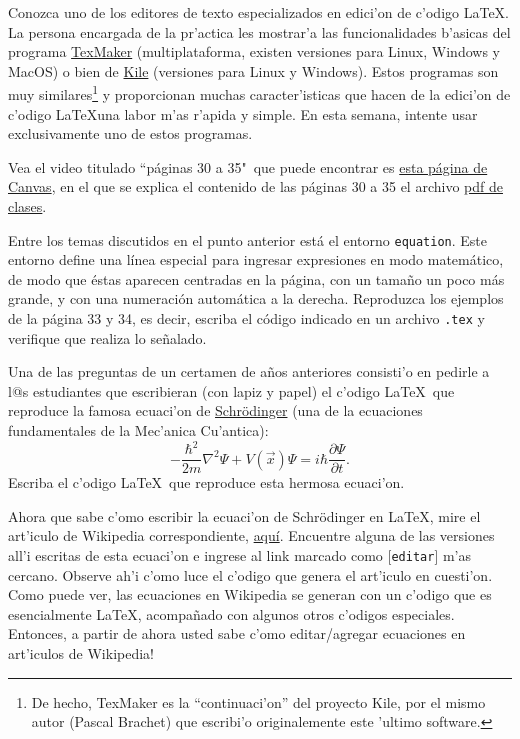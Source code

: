 \documentclass[11pt]{exam}
\begin{document}
\begin{questions}
\item Conozca uno de los editores de texto especializados en edici'on de c'odigo \LaTeX. La persona encargada de la pr'actica les mostrar'a las funcionalidades b'asicas del programa \href{http://www.xm1math.net/texmaker/}{TexMaker} (multiplataforma, existen versiones para Linux, Windows y MacOS) o bien de \href{https://kile.sourceforge.io/}{Kile} (versiones para Linux y Windows). Estos programas son muy similares\footnote{De hecho, TexMaker es la ``continuaci'on'' del proyecto Kile, por el mismo autor (Pascal Brachet) que escribi'o originalemente este 'ultimo software.} y proporcionan muchas caracter'isticas que hacen de la edici'on de c'odigo \LaTeX una labor m'as r'apida y simple. En esta semana, intente usar exclusivamente uno de estos programas.

\item Vea el video titulado ``páginas 30 a 35"\, que puede encontrar es \href{https://udec.instructure.com/courses/29314/pages/expresiones-matematicas-en-latex}{esta página de Canvas}, en el que se explica el contenido de las páginas 30 a 35 el archivo \href{https://udec.instructure.com/courses/17852/pages/latex-pdf-presentacion?module_item_id=531012}{pdf de clases}.

\item Entre los temas discutidos en el punto anterior está el entorno \texttt{equation}. Este entorno define una línea especial para ingresar expresiones en modo matemático, de modo que éstas aparecen centradas en la página, con un tamaño un poco más grande, y con una numeración automática a la derecha. Reproduzca los ejemplos de la página 33 y 34, es decir, escriba el código indicado en un archivo \texttt{.tex} y verifique que realiza lo señalado.

\item Una de las preguntas de un certamen de a\~nos anteriores consisti'o en pedirle a l@s estudiantes que escribieran (con lapiz y papel) el c'odigo \LaTeX\ que reproduce la famosa ecuaci'on de \href{https://es.wikipedia.org/wiki/Erwin_Schr\%C3\%B6dinger}{Schr\"odinger} (una de la ecuaciones fundamentales de la Mec'anica Cu'antica):
\begin{equation}
-\frac{\hbar^2}{2m}\nabla^2\Psi+V(\vec{x})\Psi=i\hbar\frac{\partial\Psi}{\partial t}.
\end{equation}
Escriba el c'odigo \LaTeX\ que reproduce esta hermosa ecuaci'on.

\item Ahora que sabe c'omo escribir la ecuaci'on de Schr\"odinger en \LaTeX, mire el art'iculo de Wikipedia correspondiente, \href{https://es.wikipedia.org/wiki/Ecuaci\%C3\%B3n_de_Schr\%C3\%B6dinger}{aqu\'i}. Encuentre alguna de las versiones all'i escritas de esta ecuaci'on e ingrese al link marcado como [\texttt{editar}] m'as cercano. Observe ah'i c'omo luce el c'odigo que genera el art'iculo en cuesti'on. Como puede ver, las ecuaciones en Wikipedia se generan con un c'odigo que es esencialmente \LaTeX, acompa\~nado con algunos otros c'odigos especiales. Entonces, a partir de ahora usted sabe c'omo editar/agregar ecuaciones en art'iculos de Wikipedia!


\end{questions}
\end{document}
